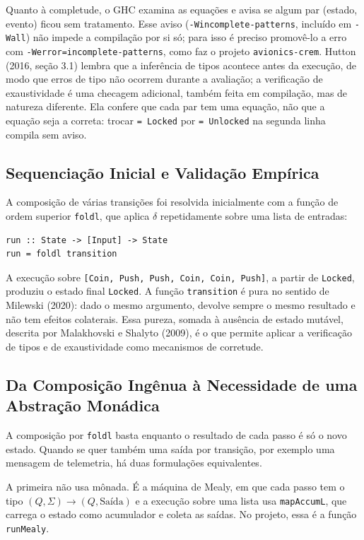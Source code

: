 \documentclass[12pt,a4paper]{article}
\begin{document}
Quanto à completude, o GHC examina as equações e avisa se algum par (estado, evento) ficou sem tratamento. Esse aviso (\texttt{-Wincomplete-patterns}, incluído em \texttt{-Wall}) não impede a compilação por si só; para isso é preciso promovê-lo a erro com \texttt{-Werror=incomplete-patterns}, como faz o projeto \texttt{avionics-crem}. Hutton (2016, seção 3.1) lembra que a inferência de tipos acontece antes da execução, de modo que erros de tipo não ocorrem durante a avaliação; a verificação de exaustividade é uma checagem adicional, também feita em compilação, mas de natureza diferente. Ela confere que cada par tem uma equação, não que a equação seja a correta: trocar \texttt{= Locked} por \texttt{= Unlocked} na segunda linha compila sem aviso.

\subsection{Sequenciação Inicial e Validação Empírica}

A composição de várias transições foi resolvida inicialmente com a função de ordem superior \texttt{foldl}, que aplica $\delta$ repetidamente sobre uma lista de entradas:

\begin{verbatim}
run :: State -> [Input] -> State
run = foldl transition
\end{verbatim}

A execução sobre \texttt{[Coin, Push, Push, Coin, Coin, Push]}, a partir de \texttt{Locked}, produziu o estado final \texttt{Locked}. A função \texttt{transition} é pura no sentido de Milewski (2020): dado o mesmo argumento, devolve sempre o mesmo resultado e não tem efeitos colaterais. Essa pureza, somada à ausência de estado mutável, descrita por Malakhovski e Shalyto (2009), é o que permite aplicar a verificação de tipos e de exaustividade como mecanismos de corretude.

\subsection{Da Composição Ingênua à Necessidade de uma Abstração Monádica}

A composição por \texttt{foldl} basta enquanto o resultado de cada passo é só o novo estado. Quando se quer também uma saída por transição, por exemplo uma mensagem de telemetria, há duas formulações equivalentes.

A primeira não usa mônada. É a máquina de Mealy, em que cada passo tem o tipo $(Q, \Sigma) \to (Q, \text{Saída})$ e a execução sobre uma lista usa \texttt{mapAccumL}, que carrega o estado como acumulador e coleta as saídas. No projeto, essa é a função \texttt{runMealy}.
\end{document}
